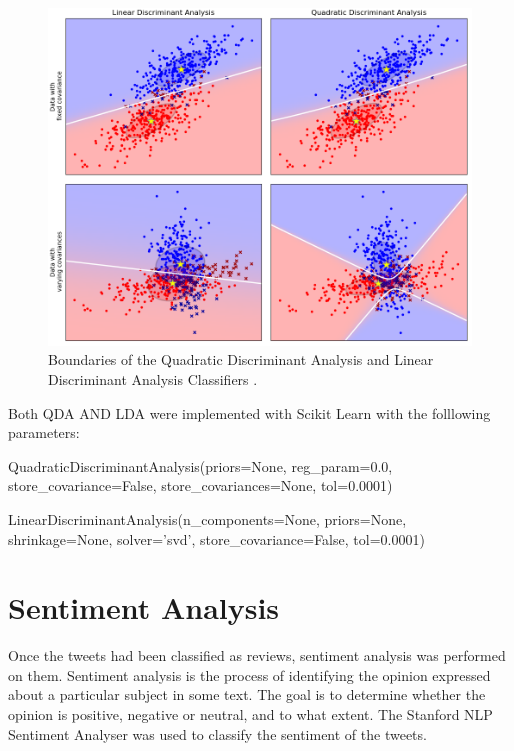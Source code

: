 \begin{figure}[h!]
\centering
\includegraphics[width=1\textwidth]{design_and_methodology/qda_and_lda.png}
\caption{\label{fig:qdalda} Boundaries of the Quadratic Discriminant Analysis and Linear Discriminant Analysis Classifiers \cite{scikit-learn}.}
\end{figure}

Both QDA AND LDA were implemented with Scikit Learn with the folllowing parameters:

\begin{tcolorbox}
\begin{center}
	QuadraticDiscriminantAnalysis(priors=None, reg\_param=0.0, store\_covariance=False, store\_covariances=None, tol=0.0001)
\end{center}
\end{tcolorbox}

\begin{tcolorbox}
\begin{center}
	LinearDiscriminantAnalysis(n\_components=None, priors=None, shrinkage=None, solver='svd', store\_covariance=False, tol=0.0001)
\end{center}
\end{tcolorbox}


\section{Sentiment Analysis}

Once the tweets had been classified as reviews, sentiment analysis was performed on them. Sentiment analysis is the process of identifying the opinion expressed about a particular subject in some text. The goal is to determine whether the opinion is positive, negative or neutral, and to what extent. The Stanford NLP Sentiment Analyser \cite{stanfordSentiment2013} was used to classify the sentiment of the tweets.

